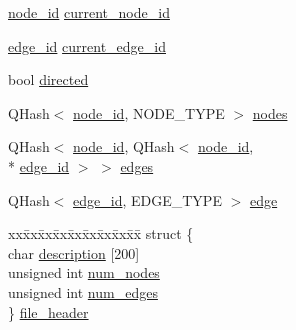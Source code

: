 \begin{DoxyCompactItemize}
\item 
\hyperlink{_complex_network_8hpp_a8323334ca788fde39682469321590d52}{node\+\_\+id} \hyperlink{class_complex_network_ab71dc127e36a989049df28f58f2c315a}{current\+\_\+node\+\_\+id}
\item 
\hyperlink{_complex_network_8hpp_ad7d18d7b90a45b6625704e92d10aa3a0}{edge\+\_\+id} \hyperlink{class_complex_network_a5305dba65a6d949064e46a6729c39e53}{current\+\_\+edge\+\_\+id}
\item 
bool \hyperlink{class_complex_network_ae1f8a32f89d84aab42475d8fe46dfa09}{directed}
\item 
Q\+Hash$<$ \hyperlink{_complex_network_8hpp_a8323334ca788fde39682469321590d52}{node\+\_\+id}, N\+O\+D\+E\+\_\+\+T\+Y\+P\+E $>$ \hyperlink{class_complex_network_a6b0ecc57af689b9ba9f8855132d1c275}{nodes}
\item 
Q\+Hash$<$ \hyperlink{_complex_network_8hpp_a8323334ca788fde39682469321590d52}{node\+\_\+id}, Q\+Hash$<$ \hyperlink{_complex_network_8hpp_a8323334ca788fde39682469321590d52}{node\+\_\+id}, \\*
\hyperlink{_complex_network_8hpp_ad7d18d7b90a45b6625704e92d10aa3a0}{edge\+\_\+id} $>$ $>$ \hyperlink{class_complex_network_adbdf613ffde926399cd5f6e7b8c09536}{edges}
\item 
Q\+Hash$<$ \hyperlink{_complex_network_8hpp_ad7d18d7b90a45b6625704e92d10aa3a0}{edge\+\_\+id}, E\+D\+G\+E\+\_\+\+T\+Y\+P\+E $>$ \hyperlink{class_complex_network_a666bb7ad7f5ab90416f037aeb1ba11d0}{edge}
\item 
\begin{tabbing}
xx\=xx\=xx\=xx\=xx\=xx\=xx\=xx\=xx\=\kill
struct \{\\
\>char \hyperlink{class_complex_network_abc2c2def62701d56ec56c8b0accbedb9}{description} \mbox{[}200\mbox{]}\\
\>unsigned int \hyperlink{class_complex_network_a6c8777ba48e68c02d2d523abe904b6b1}{num\_nodes}\\
\>unsigned int \hyperlink{class_complex_network_ac4a7f179af0187eb3071969642b445cc}{num\_edges}\\
\} \hyperlink{class_complex_network_ab9ab3dbbbcd8dd173ec40938391c0fc4}{file\_header}\\

\end{tabbing}\end{DoxyCompactItemize}


